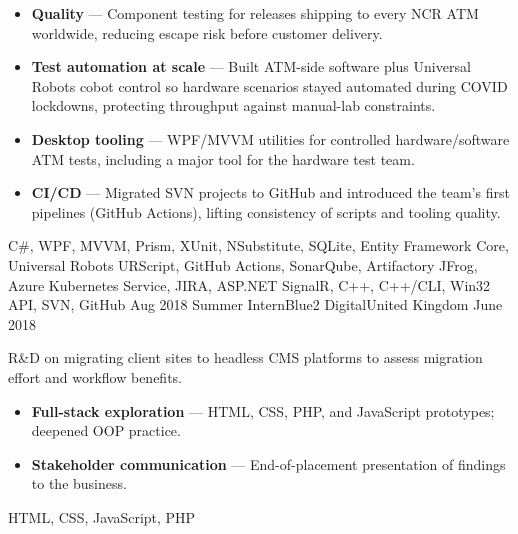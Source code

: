 \begin{experiences}
{                      \begin{itemize}
                        \item \textbf{Quality} --- Component testing for releases shipping to every NCR ATM worldwide, reducing escape risk before customer delivery.
                        \item \textbf{Test automation at scale} --- Built ATM-side software plus Universal Robots cobot control so hardware scenarios stayed automated during COVID lockdowns, protecting throughput against manual-lab constraints.
                        \item \textbf{Desktop tooling} --- WPF/MVVM utilities for controlled hardware/software ATM tests, including a major tool for the hardware test team.
                        \item \textbf{CI/CD} --- Migrated SVN projects to GitHub and introduced the team's first pipelines (GitHub Actions), lifting consistency of scripts and tooling quality.
                      \end{itemize}
                    }
                    {C\#, WPF, MVVM, Prism, XUnit, NSubstitute, SQLite, Entity Framework Core, Universal Robots URScript, GitHub Actions, SonarQube, Artifactory JFrog, Azure Kubernetes Service, JIRA, ASP.NET SignalR, C++, C++/CLI, Win32 API, SVN, GitHub}
  \emptySeparator
  \experience
    {Aug 2018}     {Summer Intern}{Blue2 Digital}{United Kingdom}
    {June 2018}    {
                      R\&D on migrating client sites to headless CMS platforms to assess migration effort and workflow benefits.
                      \begin{itemize}
                        \item \textbf{Full-stack exploration} --- HTML, CSS, PHP, and JavaScript prototypes; deepened OOP practice.
                        \item \textbf{Stakeholder communication} --- End-of-placement presentation of findings to the business.
                      \end{itemize}
                    }
                    {HTML, CSS, JavaScript, PHP}
\end{experiences}
